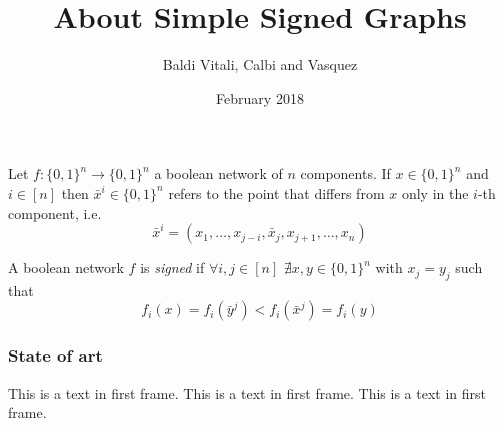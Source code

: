 \documentclass{beamer}
\title{About Simple Signed Graphs}
\author{Baldi Vitali, Calbi and Vasquez}
\institute{Université de Nice Sophia-Antipolis}
\date{February 2018}
\begin{document}
	
\frame{\titlepage}

\begin{section}{}

\end{section}
\begin{frame}
\begin{definition}[$\bar{x}^i$]
	Let $f:\{0,1\}^n \rightarrow \{0,1\}^n$ a boolean network of $n$ components. If $x \in \{0,1\}^n$ and $i \in [n]$ then $\bar{x}^i \in \{0,1\}^n$ refers to the point that differs from $x$ only in the $i$-th component, i.e.
	\[
	\bar{x}^i = (x_1, \dots, x_{j-i}, \bar{x}_j, x_{j+1}, \dots, x_n)
	\]
\end{definition}
\begin{definition}
	A boolean network $f$ is \textit{signed} if $\forall i,j \in [n]$ $\nexists x,y \in \{0,1\}^n$ with $x_j = y_j$ such that 
	\[
	f_i(x) = f_i(\bar{y}^j) < f_i(\bar{x}^j) = f_i(y)
	\]
\end{definition}
\end{frame}

\begin{frame}
\end{frame}

\begin{frame}
\frametitle{State of art}
This is a text in first frame. This is a text in first frame. This is a text in first frame.
\end{frame}
\end{document}
